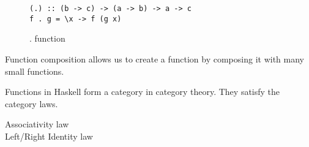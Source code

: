 \documentclass[twoside, a4paper]{article}
\begin{document}
\begin{figure}
  \centering
\begin{verbatim}
(.) :: (b -> c) -> (a -> b) -> a -> c
f . g = \x -> f (g x)
\end{verbatim}
  \caption{. function}
  \label{fig:compositionfunction}
\end{figure}

Function composition allows us to create a function by composing it with many small functions. 

Functions in Haskell form a category in category theory. They satisfy the category laws.
\begin{description}
\item[Associativity law] 
\item[Left/Right Identity law] 
\end{description}



\end{document}
